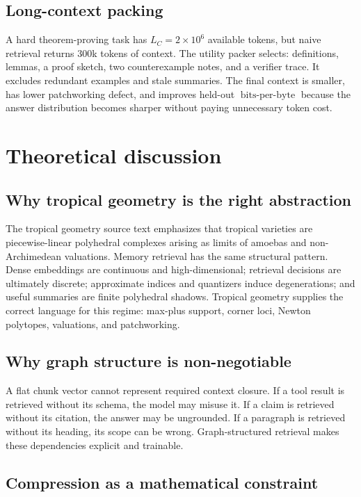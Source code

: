 \documentclass[11pt]{article}
\theoremstyle{definition}
\theoremstyle{remark}
\newcommand{\bits}{\ensuremath{\operatorname{bits\text{-}per\text{-}byte}}}
\newcommand{\LC}{L_C}
\begin{document}
\subsection{Long-context packing}

A hard theorem-proving task has \(\LC=2\times10^6\) available tokens, but naive retrieval returns 300k tokens of context. The utility packer selects: definitions, lemmas, a proof sketch, two counterexample notes, and a verifier trace. It excludes redundant examples and stale summaries. The final context is smaller, has lower patchworking defect, and improves held-out \bits{} because the answer distribution becomes sharper without paying unnecessary token cost.

\section{Theoretical discussion}

\subsection{Why tropical geometry is the right abstraction}

The tropical geometry source text emphasizes that tropical varieties are piecewise-linear polyhedral complexes arising as limits of amoebas and non-Archimedean valuations. Memory retrieval has the same structural pattern. Dense embeddings are continuous and high-dimensional; retrieval decisions are ultimately discrete; approximate indices and quantizers induce degenerations; and useful summaries are finite polyhedral shadows. Tropical geometry supplies the correct language for this regime: max-plus support, corner loci, Newton polytopes, valuations, and patchworking.

\subsection{Why graph structure is non-negotiable}

A flat chunk vector cannot represent required context closure. If a tool result is retrieved without its schema, the model may misuse it. If a claim is retrieved without its citation, the answer may be ungrounded. If a paragraph is retrieved without its heading, its scope can be wrong. Graph-structured retrieval makes these dependencies explicit and trainable.

\subsection{Compression as a mathematical constraint}
\end{document}
